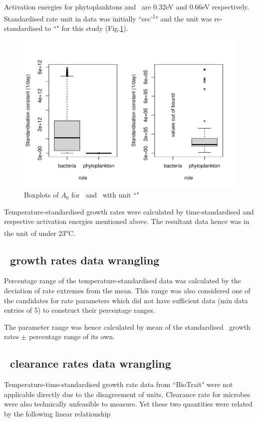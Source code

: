\documentclass[../thesis.tex]{subfiles} %
\begin{document}
Activation energies for phytoplanktons and \bac\ are 0.32eV and 0.66eV respectively\autocite{regaudie2012temperature}.  Standardised rate unit in data was initially ``sec\textsuperscript{-1}" and the unit was re-standardised to ``\dayU" for this study (Fig.\ref{f:A0}).

\begin{figure}[H]
    \centering
    \includegraphics[width=\linewidth]{../result/stdCst.pdf}
    \caption[Boxplot of standardised $A_0$]{Boxplots of $A_0$ for \phy\ and \bac\ with unit ``\dayU"}
    \label{f:A0}
\end{figure}

Temperature-standardised growth rates were calculated by time-standardised and respective activation energies mentioned above.  The resultant data hence was in the unit of \dayU under 23\textsuperscript{o}C.

\subsection{\Phy\ growth rates data wrangling}
Percentage range of the temperature-standardised data was calculated by the deviation of rate extremes from the mean.  This range was also considered one of the candidates for rate parameters which did not have sufficient data (min data entries of 5) to construct their percentage ranges.

The parameter range was hence calculated by mean of the standardised \phy\ growth rates $\pm$ percentage range of its own.

\subsection{\Bac\ clearance rates data wrangling}
Temperature-time-standardised growth rate data from ``BioTrait" were not applicable directly due to the disagreement of units.  Clearance rate for microbes were also technically unfeasible to measure.  Yet these two quantities were related by the following linear relationship
\end{document}
